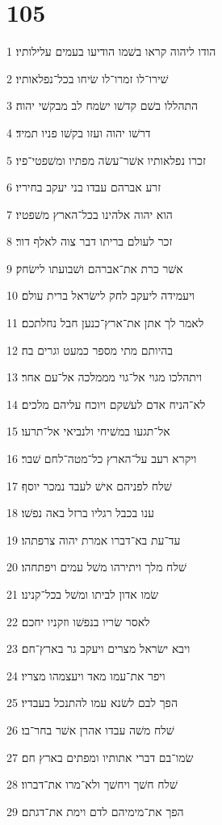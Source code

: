 \chapter{105}

\par 1 הודו ליהוה קראו בשׁמו הודיעו בעמים עלילותיו׃
\par 2 שׁירו־לו זמרו־לו שׂיחו בכל־נפלאותיו׃
\par 3 התהללו בשׁם קדשׁו ישׂמח לב מבקשׁי יהוה׃
\par 4 דרשׁו יהוה ועזו בקשׁו פניו תמיד׃
\par 5 זכרו נפלאותיו אשׁר־עשׂה מפתיו ומשׁפטי־פיו׃
\par 6 זרע אברהם עבדו בני יעקב בחיריו׃
\par 7 הוא יהוה אלהינו בכל־הארץ משׁפטיו׃
\par 8 זכר לעולם בריתו דבר צוה לאלף דור׃
\par 9 אשׁר כרת את־אברהם ושׁבועתו לישׂחק׃
\par 10 ויעמידה ליעקב לחק לישׂראל ברית עולם׃
\par 11 לאמר לך אתן את־ארץ־כנען חבל נחלתכם׃
\par 12 בהיותם מתי מספר כמעט וגרים בה׃
\par 13 ויתהלכו מגוי אל־גוי מממלכה אל־עם אחר׃
\par 14 לא־הניח אדם לעשׁקם ויוכח עליהם מלכים׃
\par 15 אל־תגעו במשׁיחי ולנביאי אל־תרעו׃
\par 16 ויקרא רעב על־הארץ כל־מטה־לחם שׁבר׃
\par 17 שׁלח לפניהם אישׁ לעבד נמכר יוסף׃
\par 18 ענו בכבל רגליו ברזל באה נפשׁו׃
\par 19 עד־עת בא־דברו אמרת יהוה צרפתהו׃
\par 20 שׁלח מלך ויתירהו משׁל עמים ויפתחהו׃
\par 21 שׂמו אדון לביתו ומשׁל בכל־קנינו׃
\par 22 לאסר שׂריו בנפשׁו וזקניו יחכם׃
\par 23 ויבא ישׂראל מצרים ויעקב גר בארץ־חם׃
\par 24 ויפר את־עמו מאד ויעצמהו מצריו׃
\par 25 הפך לבם לשׂנא עמו להתנכל בעבדיו׃
\par 26 שׁלח משׁה עבדו אהרן אשׁר בחר־בו׃
\par 27 שׂמו־בם דברי אתותיו ומפתים בארץ חם׃
\par 28 שׁלח חשׁך ויחשׁך ולא־מרו את־דברוו׃
\par 29 הפך את־מימיהם לדם וימת את־דגתם׃
